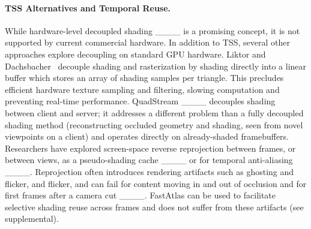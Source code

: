 \paragraph*{TSS Alternatives and Temporal Reuse.}
While hardware-level decoupled shading ____ is a promising concept, it is not supported by current commercial hardware. 
In addition to TSS, several other approaches explore decoupling on standard GPU hardware.
Liktor and Dachsbacher~ decouple shading and rasterization by shading directly into a linear buffer which stores an array of shading samples per triangle. This precludes efficient hardware texture sampling and filtering, slowing computation and preventing real-time performance. QuadStream ____ decouples shading between client and server; it addresses a different problem than a fully decoupled shading method (reconstructing occluded geometry and shading, seen from novel viewpoints on a client) and operates directly on already-shaded framebuffers.
Researchers have explored screen-space reverse reprojection between frames, or between views, as a pseudo-shading cache ____ or for temporal anti-aliasing ____.  Reprojection often introduces rendering artifacts such as ghosting and flicker, and flicker, and can fail for content moving in and out of occlusion and for first frames after a camera cut ____. FastAtlas can be used to facilitate selective shading reuse across frames and does not suffer from these artifacts (see supplemental).